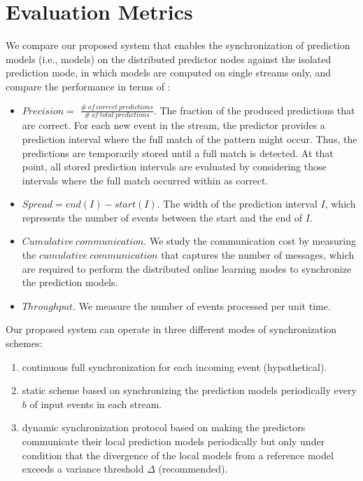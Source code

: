 \section{Evaluation Metrics} 
\label{sec:metrics}
\par We compare our proposed system that enables the synchronization of prediction models (i.e., \pmcmr models) on the distributed predictor nodes against the isolated prediction mode, in which models are computed on single streams only, and compare the  performance in terms of :
\begin{itemize}
	
	\item  $\mathit{Precision} =$ $ \mathit{\frac{\#\ of\ correct\ predictions}{\#\ of\ total\ predictions}}$. The fraction of the produced predictions that are correct. For each new event in the stream, the predictor provides a prediction interval where the full match of the pattern might occur. Thus, the predictions are temporarily stored until a full match is detected. At that point, all stored prediction intervals are evaluated by considering those intervals where the full match occurred within as correct.     
	
	\item $\mathit{Spread}$$ =end(I) -start(I)$. The width of the prediction interval $I$, which represents the number of events between the start and the end of $I$. 
	
	\item  $\mathit{Cumulative\ communication}$. We study the communication cost by measuring the $\mathit{cumulative\ communication}$ that captures the number of messages, which are required to perform the distributed online learning modes to synchronize the prediction models.
	
\item $Throughput$. We measure the number of events processed per unit time.
\end{itemize} 

Our proposed system can operate in three different modes of synchronization schemes: \begin{enumerate}[label=(\roman*)] 
	\item continuous full synchronization for each incoming event (hypothetical).
	\item static scheme based on synchronizing the prediction models periodically every $b$ of input events in each stream.
	\item dynamic synchronization protocol based on making the predictors communicate their local prediction models periodically but only under condition that the divergence of the local models from a reference model exceeds a variance threshold $\Delta$ (recommended).  	   
	
\end{enumerate}



